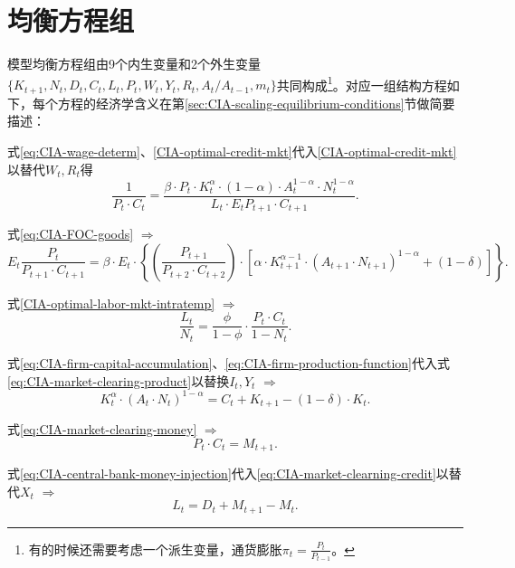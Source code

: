 \section{均衡方程组}
\label{sec:CIA-equilibrium-conditions}
模型均衡方程组由9个内生变量和2个外生变量$\{K_{t+1}, N_t, D_t, C_t, L_t, P_t, W_t, Y_t, R_t, A_t/A_{t-1}, m_t\}$共同构成\footnote{有的时候还需要考虑一个派生变量，通货膨胀$\pi_t = \frac{P_t}{P_{t-1}}$。}。对应一组结构方程如下，每个方程的经济学含义在第\ref{sec:CIA-scaling-equilibrium-conditions}节做简要描述：

式\eqref{eq:CIA-wage-determ}、\eqref{CIA-optimal-credit-mkt}代入\eqref{CIA-optimal-credit-mkt}以替代$W_t,R_t$得
  \begin{equation}
    \label{eq:CIA-equil-cond-unscal-inter-euler}
    \frac{1}{P_t \cdot C_t} = \frac{\beta \cdot P_t \cdot K_t^{\alpha} \cdot (1-\alpha) \cdot A_{t}^{1-\alpha} \cdot N_t^{1-\alpha}}{L_t \cdot E_t P_{t+1} \cdot C_{t+1}}.
  \end{equation}

式\eqref{eq:CIA-FOC-goods} $\Rightarrow$
  \begin{equation*}
    E_t \frac{P_t}{P_{t+1} \cdot C_{t+1}} = \beta \cdot E_t \cdot
    \left\{
  \left( \frac{P_{t+1}}{P_{t+2} \cdot C_{t+2}} \right) \cdot
  \left[
    \alpha \cdot K_{t+1}^{\alpha -1} \cdot
    \left(A_{t+1} \cdot N_{t+1} \right)^{1-\alpha} + (1-\delta)
  \right]
    \right\}.
  \end{equation*}

式\eqref{CIA-optimal-labor-mkt-intratemp} $\Rightarrow$
  \begin{equation*}
    \frac{L_t}{N_t}=\frac{\phi}{1-\phi} \cdot \frac{P_t \cdot C_t}{1-N_t}.
  \end{equation*}

式\eqref{eq:CIA-firm-capital-accumulation}、\eqref{eq:CIA-firm-production-function}代入式\eqref{eq:CIA-market-clearing-product}以替换$I_t, Y_t$ $\Rightarrow$
    \begin{equation}
    \label{eq:CIA-equil-cond-unscal-resource}
      K_t^{\alpha} \cdot \left( A_t \cdot N_t \right)^{1-\alpha} = C_t + K_{t+1} - \left( 1 - \delta \right) \cdot K_t.
    \end{equation}

式\eqref{eq:CIA-market-clearing-money} $\Rightarrow$
  \begin{equation*}
    P_t \cdot C_t = M_{t+1}.
  \end{equation*}

式\eqref{eq:CIA-central-bank-money-injection}代入\eqref{eq:CIA-market-clearning-credit}以替代$X_t$ $\Rightarrow$
  \begin{equation}
    \label{eq:CIA-equil-cond-unscal-credit}
    L_t = D_t + M_{t+1} - M_{t}.
  \end{equation}

